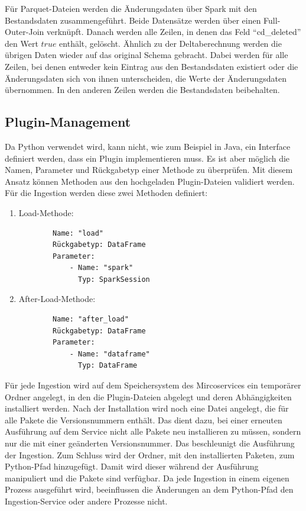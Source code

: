 Für Parquet-Dateien werden die Änderungsdaten über Spark mit den Bestandsdaten zusammengeführt.
Beide Datensätze werden über einen Full-Outer-Join verknüpft.
Danach werden alle Zeilen, in denen das Feld "`cd\_deleted"' den Wert $true$ enthält, gelöscht.
Ähnlich zu der Deltaberechnung werden die übrigen Daten wieder auf das original Schema gebracht.
Dabei werden für alle Zeilen, bei denen entweder kein Eintrag aus den Bestandsdaten existiert oder die Änderungsdaten sich von ihnen unterscheiden, die Werte der Änderungsdaten übernommen.
In den anderen Zeilen werden die Bestandsdaten beibehalten.

\subsection{Plugin-Management}

Da Python verwendet wird, kann nicht, wie zum Beispiel in Java, ein Interface definiert werden, dass ein Plugin implementieren muss.
Es ist aber möglich die Namen, Parameter und Rückgabetyp einer Methode zu überprüfen.
Mit diesem Ansatz können Methoden aus den hochgeladen Plugin-Dateien validiert werden.
Für die Ingestion werden diese zwei Methoden definiert: \begin{enumerate}
    \item Load-Methode: \begin{verbatim}
        Name: "load"
        Rückgabetyp: DataFrame
        Parameter:
            - Name: "spark"
              Typ: SparkSession
    \end{verbatim}
    \item After-Load-Methode: \begin{verbatim}
        Name: "after_load"
        Rückgabetyp: DataFrame
        Parameter:
            - Name: "dataframe"
              Typ: DataFrame
    \end{verbatim}
\end{enumerate}

Für jede Ingestion wird auf dem Speichersystem des Mircoservices ein temporärer Ordner angelegt, in den die Plugin-Dateien abgelegt und deren Abhängigkeiten installiert werden.
Nach der Installation wird noch eine Datei angelegt, die für alle Pakete die Versionsnummern enthält.
Das dient dazu, bei einer erneuten Ausführung auf dem Service nicht alle Pakete neu installieren zu müssen, sondern nur die mit einer geänderten Versionsnummer.
Das beschleunigt die Ausführung der Ingestion.
Zum Schluss wird der Ordner, mit den installierten Paketen, zum Python-Pfad hinzugefügt.
Damit wird dieser während der Ausführung manipuliert und die Pakete sind verfügbar.
Da jede Ingestion in einem eigenen Prozess ausgeführt wird, beeinflussen die Änderungen an dem Python-Pfad den Ingestion-Service oder andere Prozesse nicht.

